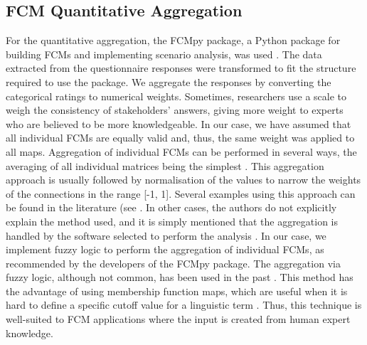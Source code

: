 \begin{appendices}
\begin{xltabular}{\textwidth}{XX}
\end{xltabular}

\clearpage


\subsection{FCM Quantitative Aggregation}
\label{quantitativeAgg}

For the quantitative aggregation, the FCMpy package, a Python package for building FCMs and implementing scenario analysis, was used \citep{mkhitaryan2022fcmpy}. The data extracted from the questionnaire responses were transformed to fit the structure required to use the package. We aggregate the responses by converting the categorical ratings to numerical weights. Sometimes, researchers use a scale to weigh the consistency of stakeholders' answers, giving more weight to experts who are believed to be more knowledgeable. In our case, we have assumed that all individual FCMs are equally valid and, thus, the same weight was applied to all maps. Aggregation of individual FCMs can be performed in several ways, the averaging of all individual matrices being the simplest \citep{jetter2014fuzzy}. This aggregation approach is usually followed by normalisation of the values to narrow the weights of the connections in the range [-1, 1]. Several examples using this approach can be found in the literature (see \citep{lopolito2020combined, morone2021using, morone2019promote}. In other cases, the authors do not explicitly explain the method used, and it is simply mentioned that the aggregation is handled by the software selected to perform the analysis \citep{konti2022determinants, kokkinos2020circular, falcone2020use}. In our case, we implement fuzzy logic to perform the aggregation of individual FCMs, as recommended by the developers of the FCMpy package. The aggregation via fuzzy logic, although not common, has been used in the past \citep{nasirzadeh2020modelling, amini2022combined}. This method has the advantage of using membership function maps, which are useful when it is hard to define a specific cutoff value for a linguistic term \citep{wang2015study}. Thus, this technique is well-suited to FCM applications where the input is created from human expert knowledge. 


\end{appendices}
